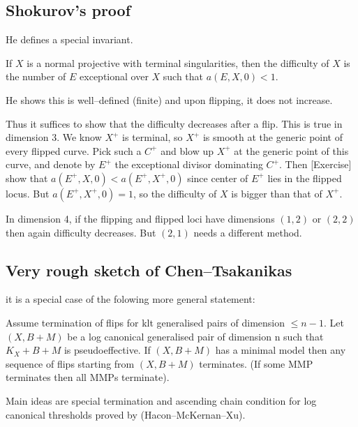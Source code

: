 \subsection{Shokurov's proof} He defines a special invariant.

\begin{definition}
    If \(X\) is a normal projective with terminal singularities, then the
    difficulty of \(X\) is the number of \(E\) exceptional over \(X\) such that
    \(a(E,X,0)<1\).
\end{definition}
He shows this is well--defined (finite) and upon flipping, it does not increase.

Thus it suffices to show that the difficulty decreases after a flip. This is
true in dimension \(3\). We know \(X^+\) is terminal, so \(X^+\) is smooth at
the generic point of every flipped curve. Pick such a \(C^+\) and blow up
\(X^+\) at the generic point of this curve, and denote by \(E^+\) the
exceptional divisor dominating \(C^+\). Then [Exercise] show that
\(a(E^+,X,0)<a(E^+,X^+,0)\) since center of \(E^+\) lies in the flipped locus.
But \(a(E^+,X^+,0)=1\), so the difficulty of \(X\) is bigger than that of
\(X^+\).

In dimension 4, if the flipping and flipped loci have dimensions \((1,2)\) or
\((2,2)\) then again difficulty decreases. But \((2,1)\) needs a different
method.

\subsection{Very rough sketch of Chen--Tsakanikas} it is a special case of the
folowing more general statement:
\begin{theorem}
    Assume termination of flips for klt generalised pairs of dimension \(\leq
    n-1\). Let \((X,B+M)\) be a log canonical generalised pair of dimension n
    such that \(K_X+B+M\) is pseudoeffective. If \((X,B+M)\) has a minimal model
    then any sequence of flips starting from \((X,B+M)\) terminates. (If some
    MMP terminates then all MMPs terminate).
\end{theorem}

Main ideas are special termination and ascending chain condition for log
canonical thresholds proved by (Hacon--McKernan--Xu).
